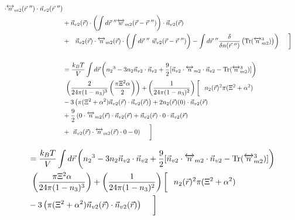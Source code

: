 \documentclass[double,12pt]{beavtex}
\begin{document}
\begin{align}
     \cdot \overleftrightarrow n_{m2}(\vec r~'')\cdot \vec n_{v2}( \vec r~'') \nonumber\\
     &+\vec n_{v2}(\vec r)\cdot \left(\int d\vec r~'' \overleftrightarrow 
     w_{m2}(\vec r-\vec r~'')\right)
     \cdot \vec n_{v2}( \vec r) \nonumber\\
     &+ \color{white}\left(\color{black}\vec n_{v2}( \vec r)\cdot 
     \overleftrightarrow n_{m2}(\vec r)
     \cdot \left(\int d\vec r~'' ~\vec w_{v2}(\vec r-\vec r~'')\right)-\int d\vec r~'' 
     \frac{\delta}{\delta n(\vec r~'')}\left(\operatorname{Tr}
     ({\overleftrightarrow{n}^3_{m2}})\right)\right)
     \color{white}\left[\frac{1}{1}\color{black}\right] \\ \nonumber \\
%
&=\frac{k_BT}{V}\int d\vec r \left( {n_2}^3-3n_2
    \vec{n}_{v2}\cdot\vec{n}_{v2} 
     +\frac{9}{2}[\vec{n}_{v2}\cdot{\overleftrightarrow{n}_{m2}}\cdot{
     \vec{n}_{v2}}-\operatorname{Tr}({\overleftrightarrow{n}^3_{m2}})]
     \right) \nonumber\\
     &~\left(\frac{2}{24\pi(1-n_3)^3}\left(\frac{\pi\Xi^2\alpha}{2}\right)
     \right) + \left(\frac{1}{24\pi(1-n_3)^2}\right)\left[\color{white}
     \frac{1}{1}\color{black}n_2(\vec r)^2
     \pi(\Xi^2 + \alpha^2) \color{white}\right]\\
     &- 3\left(\pi(\Xi^2 + \alpha^2)\vec n_{v2}
     (\vec r) \cdot \vec n_{v2}(\vec r)\right) + 2n_2(\vec r)(0)\cdot 
     \vec n_{v2}(\vec r)\\
     &+\frac{9}{2}\left(0
     \cdot \overleftrightarrow n_{m2}(\vec r)\cdot \vec n_{v2}( \vec r)
     +\vec n_{v2}(\vec r)\cdot 0 \cdot \vec n_{v2}( \vec r)\color{white}
     \right)\\
     &+ \color{white}\left(\color{black}\vec n_{v2}( \vec r)\cdot 
     \overleftrightarrow n_{m2}(\vec r)
     \cdot 0-0\right) 
     \color{white}\left[\frac{1}{1}\color{black}\right]
\end{align} 

\begin{align} %
%
&=\frac{k_BT}{V}\int d\vec r \left({n_2}^3-3n_2
   \vec{n}_{v2}\cdot\vec{n}_{v2} 
    +\frac{9}{2}[\vec{n}_{v2}\cdot{\overleftrightarrow{n}_{m2}}\cdot{
    \vec{n}_{v2}}-\operatorname{Tr}({\overleftrightarrow{n}^3_{m2}})]
    \right) \nonumber\\
    &~\left(\frac{\pi\Xi^2\alpha}{24\pi(1-n_3)^3}
    \right) + \left(\frac{1}{24\pi(1-n_3)^2}\right)\left[\color{white}
    \frac{1}{1}\color{black}n_2(\vec r)^2
    \pi(\Xi^2 + \alpha^2) \color{white}\right] \\
    &- 3\left(\pi(\Xi^2 + \alpha^2)\vec n_{v2}
    (\vec r) \cdot \vec n_{v2}(\vec r)\right) 
    \color{white}\left[\frac{1}{1}\color{black}\right]
\end{align}
\end{document}
